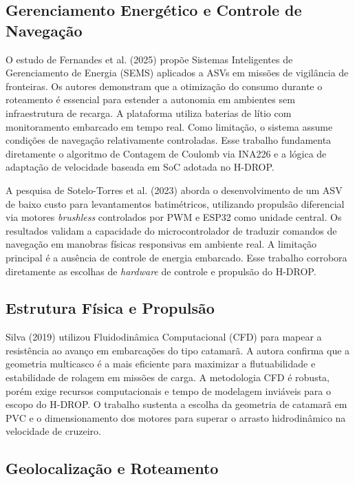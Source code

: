 \documentclass[12pt,a4paper]{article}
\begin{document}
\subsection{Gerenciamento Energético e Controle de Navegação}

O estudo de Fernandes et al. (2025) \cite{fernandes2025smart} propõe Sistemas Inteligentes de Gerenciamento de Energia (SEMS) aplicados a ASVs em missões de vigilância de fronteiras. Os autores demonstram que a otimização do consumo durante o roteamento é essencial para estender a autonomia em ambientes sem infraestrutura de recarga. A plataforma utiliza baterias de lítio com monitoramento embarcado em tempo real. Como limitação, o sistema assume condições de navegação relativamente controladas. Esse trabalho fundamenta diretamente o algoritmo de Contagem de Coulomb via INA226 e a lógica de adaptação de velocidade baseada em SoC adotada no H-DROP.

A pesquisa de Sotelo-Torres et al. (2023) \cite{sotelo2023usv} aborda o desenvolvimento de um ASV de baixo custo para levantamentos batimétricos, utilizando propulsão diferencial via motores \textit{brushless} controlados por PWM e ESP32 como unidade central. Os resultados validam a capacidade do microcontrolador de traduzir comandos de navegação em manobras físicas responsivas em ambiente real. A limitação principal é a ausência de controle de energia embarcado. Esse trabalho corrobora diretamente as escolhas de \textit{hardware} de controle e propulsão do H-DROP.

\subsection{Estrutura Física e Propulsão}

Silva (2019) \cite{silva2019} utilizou Fluidodinâmica Computacional (CFD) para mapear a resistência ao avanço em embarcações do tipo catamarã. A autora confirma que a geometria multicasco é a mais eficiente para maximizar a flutuabilidade e estabilidade de rolagem em missões de carga. A metodologia CFD é robusta, porém exige recursos computacionais e tempo de modelagem inviáveis para o escopo do H-DROP. O trabalho sustenta a escolha da geometria de catamarã em PVC e o dimensionamento dos motores para superar o arrasto hidrodinâmico na velocidade de cruzeiro.

\subsection{Geolocalização e Roteamento}
\end{document}
